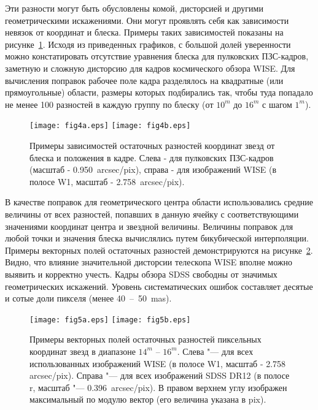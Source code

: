 Эти разности могут быть обусловлены комой, дисторсией и другими геометрическими искажениями. Они могут проявлять себя как зависимости невязок от координат и блеска. Примеры таких зависимостей показаны на рисунке~\ref{fig:15posL}. Исходя из приведенных графиков, с большой долей уверенности можно констатировать отсутствие уравнения блеска для пулковских ПЗС-кадров, заметную и сложную дисторсию для кадров космического обзора WISE. Для вычисления поправок рабочее поле кадра разделялось на квадратные (или прямоугольные) области, размеры которых подбирались так, чтобы туда попадало не менее 100 разностей в каждую группу по блеску (от $10^m$ до $16^m$ с шагом $1^m$).

\begin{figure}[h]
\centering
\texttt{[image: fig4a.eps]}
\texttt{[image: fig4b.eps]}
\caption{Примеры зависимостей остаточных разностей координат звезд от блеска и положения в кадре. Слева - для пулковских ПЗС-кадров (масштаб - 0.950~arcsec/pix), справа - для изображений WISE (в полосе W1, масштаб - 2.758~arcsec/pix).}
\label{fig:15posL}
\end{figure}

В качестве поправок для геометрического центра области использовались средние величины от всех разностей, попавших в данную ячейку с соответствующими значениями координат центра и звездной величины. Величины поправок для любой точки и значения блеска вычислялись путем бикубической интерполяции. Примеры векторных полей остаточных разностей демонстрируются на рисунке~\ref{fig:15pixL}. Видно, что влияние значительной дисторсии телескопа WISE вполне можно выявить и корректно учесть. Кадры обзора SDSS свободны от значимых геометрических искажений. Уровень систематических ошибок составляет десятые и сотые доли пикселя (менее 40~--~50~mas).

\begin{figure}[h]
\centering
\texttt{[image: fig5a.eps]}
\texttt{[image: fig5b.eps]}
\caption{Примеры векторных полей остаточных разностей пиксельных координат звезд в диапазоне $14^m$ -- $16^m$. Слева "--- для всех использованных изображений WISE (в полосе W1, масштаб - 2.758 arcsec/pix). Справа "--- для всех изображений SDSS DR12 (в полосе r, масштаб "--- 0.396~arcsec/pix). В правом верхнем углу изображен максимальный по модулю вектор (его величина указана в pix).}
\label{fig:15pixL}
\end{figure}

